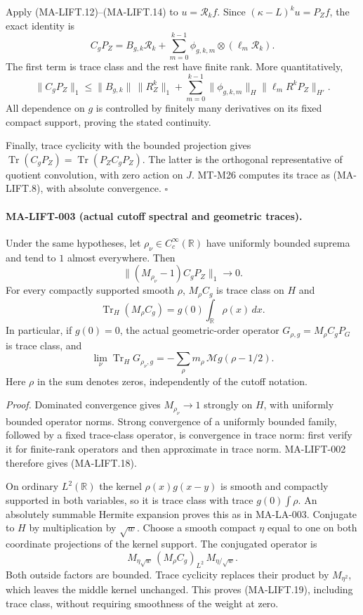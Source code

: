 Apply (MA-LIFT.12)--(MA-LIFT.14) to $u=\mathcal R_kf$.
Since $(\kappa-L)^ku=P_Zf$, the exact identity is
\[
 C_gP_Z=B_{g,k}\mathcal R_k+
     \sum_{m=0}^{k-1}\phi_{g,k,m}\otimes(\ell_m\mathcal R_k).
 \tag{MA-LIFT.16}
\]
The first term is trace class and the rest have finite rank.
More quantitatively,
\[
 \|C_gP_Z\|_1\le \|B_{g,k}\|\,\|R_Z^k\|_1+
   \sum_{m=0}^{k-1}\|\phi_{g,k,m}\|_H
                    \|\ell_mR^kP_Z\|_{H'}.
 \tag{MA-LIFT.17}
\]
All dependence on $g$ is controlled by finitely many derivatives
on its fixed compact support, proving the stated continuity.

Finally, trace cyclicity with the bounded projection gives
$\operatorname{Tr}(C_gP_Z)=\operatorname{Tr}(P_ZC_gP_Z)$.
The latter is the orthogonal representative of quotient
convolution, with zero action on $J$. MT-M26 computes its
trace as (MA-LIFT.8), with absolute convergence.
\hfill$\square$

\paragraph{MA-LIFT-003 (actual cutoff spectral and geometric traces).}
Under the same hypotheses, let $\rho_\nu\in C_c^\infty(\mathbb R)$
have uniformly bounded suprema and tend to $1$ almost everywhere.
Then
\[
       \|(M_{\rho_\nu}-1)C_gP_Z\|_1\longrightarrow0.
 \tag{MA-LIFT.18}
\]
For every compactly supported smooth $\rho$, $M_\rho C_g$
is trace class on $H$ and
\[
 \operatorname{Tr}_H(M_\rho C_g)=g(0)\int_{\mathbb R}\rho(x)\,dx.
 \tag{MA-LIFT.19}
\]
In particular, if $g(0)=0$, the actual geometric-order operator
$G_{\rho,g}=M_\rho C_gP_G$ is trace class, and
\[
 \lim_\nu\operatorname{Tr}_H G_{\rho_\nu,g}
       =-\sum_\rho m_\rho\,\mathcal Mg(\rho-1/2).
 \tag{MA-LIFT.20}
\]
Here $\rho$ in the sum denotes zeros, independently of the
cutoff notation.

\emph{Proof.}
Dominated convergence gives $M_{\rho_\nu}\to1$ strongly on $H$,
with uniformly bounded operator norms. Strong convergence of a
uniformly bounded family, followed by a fixed trace-class
operator, is convergence in trace norm: first verify it for
finite-rank operators and then approximate in trace norm.
MA-LIFT-002 therefore gives (MA-LIFT.18).

On ordinary $L^2(\mathbb R)$ the kernel $\rho(x)g(x-y)$ is
smooth and compactly supported in both variables, so it is
trace class with trace $g(0)\int\rho$. An absolutely summable
Hermite expansion proves this as in MA-LA-003.
Conjugate to $H$ by multiplication by $\sqrt w$. Choose a smooth
compact $\eta$ equal to one on both coordinate projections of
the kernel support. The conjugated operator is
\[
 M_{\eta\sqrt w}\,(M_\rho C_g)_{L^2}\,M_{\eta/\sqrt w}.
\]
Both outside factors are bounded. Trace cyclicity replaces their
product by $M_{\eta^2}$, which leaves the middle kernel unchanged.
This proves (MA-LIFT.19), including trace class, without requiring
smoothness of the weight at zero.

